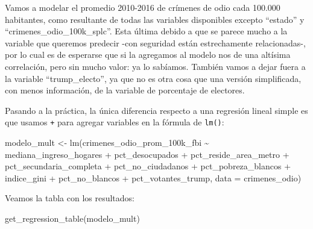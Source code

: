 \documentclass[
]{book}
\newenvironment{Shaded}{\begin{snugshade}}{\end{snugshade}}
\newcommand{\AttributeTok}[1]{\textcolor[rgb]{0.77,0.63,0.00}{#1}}
\newcommand{\FunctionTok}[1]{\textcolor[rgb]{0.00,0.00,0.00}{#1}}
\newcommand{\NormalTok}[1]{#1}
\newcommand{\OtherTok}[1]{\textcolor[rgb]{0.56,0.35,0.01}{#1}}
\newcommand{\SpecialCharTok}[1]{\textcolor[rgb]{0.00,0.00,0.00}{#1}}
\begin{document}
Vamos a modelar el promedio 2010-2016 de crímenes de odio cada 100.000 habitantes, como resultante de todas las variables disponibles excepto ``estado'' y ``crimenes\_odio\_100k\_splc''. Esta última debido a que se parece mucho a la variable que queremos predecir -con seguridad están estrechamente relacionadas-, por lo cual es de esperarse que si la agregamos al modelo nos de una altísima correlación, pero sin mucho valor: ya lo sabíamos. También vamos a dejar fuera a la variable ``trump\_electo'', ya que no es otra cosa que una versión simplificada, con menos información, de la variable de porcentaje de electores.

Pasando a la práctica, la única diferencia respecto a una regresión lineal simple es que usamos \texttt{+} para agregar variables en la fórmula de \texttt{lm()}:

\begin{Shaded}
\begin{Highlighting}[]
\NormalTok{modelo\_mult }\OtherTok{\textless{}{-}} \FunctionTok{lm}\NormalTok{(crimenes\_odio\_prom\_100k\_fbi }\SpecialCharTok{\textasciitilde{}} 
\NormalTok{                    mediana\_ingreso\_hogares }\SpecialCharTok{+}\NormalTok{ pct\_desocupados }\SpecialCharTok{+}\NormalTok{ pct\_reside\_area\_metro }\SpecialCharTok{+}
\NormalTok{                    pct\_secundaria\_completa }\SpecialCharTok{+}\NormalTok{ pct\_no\_ciudadanos }\SpecialCharTok{+}\NormalTok{ pct\_pobreza\_blancos }\SpecialCharTok{+} 
\NormalTok{                    indice\_gini }\SpecialCharTok{+}\NormalTok{ pct\_no\_blancos }\SpecialCharTok{+}\NormalTok{ pct\_votantes\_trump,}
                  \AttributeTok{data =}\NormalTok{ crimenes\_odio)}
\end{Highlighting}
\end{Shaded}

Veamos la tabla con los resultados:

\begin{Shaded}
\begin{Highlighting}[]
\FunctionTok{get\_regression\_table}\NormalTok{(modelo\_mult)}
\end{Highlighting}
\end{Shaded}
\end{document}
